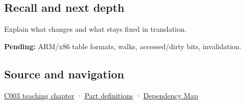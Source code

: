 \subsection{Recall and next depth}\label{appendix-01e5905165c4-recall-and-next-depth}

Explain what changes and what stays fixed in translation.

\textbf{Pending:} ARM/x86 table formats, walks, accessed/dirty bits, invalidation.

\subsection{Source and navigation}\label{appendix-01e5905165c4-source-and-navigation}

\hyperref[01-foundations-i-ch002-where-the-bytes-live]{C003 teaching chapter} · \hyperref[appendix-fd090d982a15-m003---parts-41-60]{Part definitions} · \hyperref[appendix-4ad47bdd269a]{Dependency Map}
